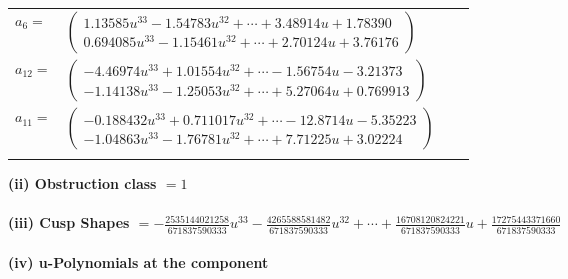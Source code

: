 \documentclass[1p]{elsarticle_modified}
\theoremstyle{definition}
\begin{document}
\begin{tabular}{m{7pt} m{180pt} m{7pt} m{180pt} }
\flushright $a_{6}=$&$\begin{pmatrix}1.13585 u^{33}-1.54783 u^{32}+\cdots+3.48914 u+1.78390\\0.694085 u^{33}-1.15461 u^{32}+\cdots+2.70124 u+3.76176\end{pmatrix}$ \\
\flushright $a_{12}=$&$\begin{pmatrix}-4.46974 u^{33}+1.01554 u^{32}+\cdots-1.56754 u-3.21373\\-1.14138 u^{33}-1.25053 u^{32}+\cdots+5.27064 u+0.769913\end{pmatrix}$ \\
\flushright $a_{11}=$&$\begin{pmatrix}-0.188432 u^{33}+0.711017 u^{32}+\cdots-12.8714 u-5.35223\\-1.04863 u^{33}-1.76781 u^{32}+\cdots+7.71225 u+3.02224\end{pmatrix}$\\&\end{tabular}
\flushleft \textbf{(ii) Obstruction class $= 1$}\\~\\
\flushleft \textbf{(iii) Cusp Shapes $= -\frac{2535144021258}{671837590333} u^{33}-\frac{4265588581482}{671837590333} u^{32}+\cdots+\frac{16708120824221}{671837590333} u+\frac{17275443371660}{671837590333}$}\\~\\
\newpage\renewcommand{\arraystretch}{1}
\flushleft \textbf{(iv) u-Polynomials at the component}\newline \\
\end{document}
